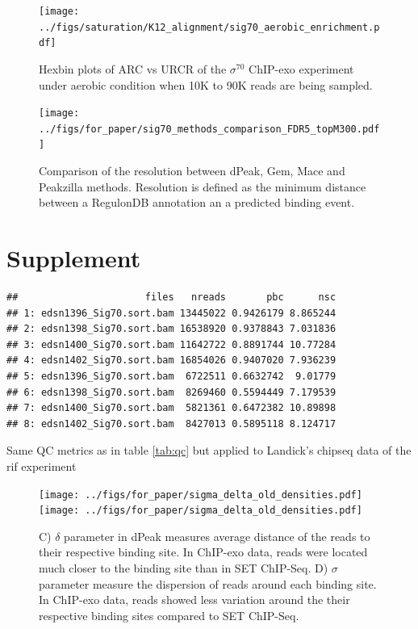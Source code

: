 \documentclass{bmcart}\usepackage[]{graphicx}\usepackage[]{color}
\makeatletter
\newenvironment{kframe}{%
 \def\at@end@of@kframe{}%
 \ifinner\ifhmode%
  \def\at@end@of@kframe{\end{minipage}}%
  \begin{minipage}{\columnwidth}%
 \fi\fi%
 \def\FrameCommand##1{\hskip\@totalleftmargin \hskip-\fboxsep
 \colorbox{shadecolor}{##1}\hskip-\fboxsep
     \hskip-\linewidth \hskip-\@totalleftmargin \hskip\columnwidth}%
 \MakeFramed {\advance\hsize-\width
   \@totalleftmargin\z@ \linewidth\hsize
   \@setminipage}}%
 {\par\unskip\endMakeFramed%
 \at@end@of@kframe}
\newenvironment{knitrout}{}{} %
\newcommand{\sig}{\sigma^{70}}
\makeatother
\begin{document}
\begin{figure}[h!]
  \centering
\texttt{[image: ../figs/saturation/K12\_alignment/sig70\_aerobic\_enrichment.pdf]}
\caption{Hexbin plots of ARC vs URCR of the $\sig$ ChIP-exo experiment
  under aerobic condition when 10K to 90K reads are being sampled.}
  \label{fig:exoQC_sat_aero}
\end{figure}

\newpage


\begin{figure}[h!]
  \centering
  \texttt{[image: ../figs/for\_paper/sig70\_methods\_comparison\_FDR5\_topM300.pdf]}
  \caption{Comparison of the resolution between dPeak, Gem, Mace and
    Peakzilla methods. Resolution is defined as the minimum distance
    between a RegulonDB annotation an a predicted binding event.}
  \label{fig:methods_comp}
\end{figure}

\newpage

\section*{Supplement}
\label{sec:supp}


\begin{table}[h!]
  \centering
\begin{knitrout}
\color{fgcolor}\begin{kframe}
\begin{verbatim}
##                      files   nreads       pbc      nsc
## 1: edsn1396_Sig70.sort.bam 13445022 0.9426179 8.865244
## 2: edsn1398_Sig70.sort.bam 16538920 0.9378843 7.031836
## 3: edsn1400_Sig70.sort.bam 11642722 0.8891744 10.77284
## 4: edsn1402_Sig70.sort.bam 16854026 0.9407020 7.936239
## 5: edsn1396_Sig70.sort.bam  6722511 0.6632742  9.01779
## 6: edsn1398_Sig70.sort.bam  8269460 0.5594449 7.179539
## 7: edsn1400_Sig70.sort.bam  5821361 0.6472382 10.89898
## 8: edsn1402_Sig70.sort.bam  8427013 0.5895118 8.124717
\end{verbatim}
\end{kframe}
\end{knitrout}
\caption{Same QC metrics as in table \ref{tab:qc} but applied to
  Landick's chipseq data of the rif experiment}
\end{table}

\begin{figure}[h!]
  \centering %
   \texttt{[image: ../figs/for\_paper/sigma\_delta\_old\_densities.pdf]}
   \texttt{[image: ../figs/for\_paper/sigma\_delta\_old\_densities.pdf]}   
  \caption{ C) $\delta$ parameter in dPeak measures average distance
    of the reads to their respective binding site. In ChIP-exo data,
    reads were located much closer to the binding site than in SET
    ChIP-Seq. D) $\sigma$ parameter measure the dispersion of reads
    around each binding site. In ChIP-exo data, reads showed less
    variation around the their respective binding sites compared to
    SET ChIP-Seq.}

\end{figure}
\end{document}
